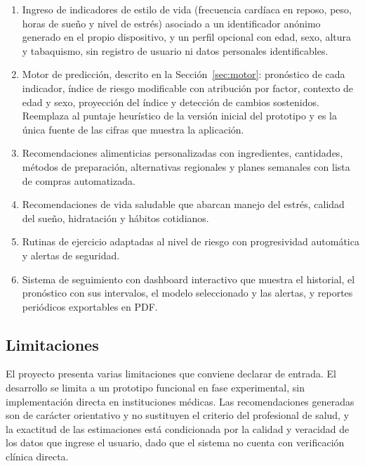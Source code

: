 \documentclass[12pt,letterpaper]{article}
\begin{document}
\begin{enumerate}
  \item Ingreso de indicadores de estilo de vida (frecuencia cardíaca en
    reposo, peso, horas de sueño y nivel de estrés) asociado a un identificador
    anónimo generado en el propio dispositivo, y un perfil opcional con edad,
    sexo, altura y tabaquismo, sin registro de usuario ni datos personales
    identificables.

  \item Motor de predicción, descrito en la Sección~\ref{sec:motor}: pronóstico
    de cada indicador, índice de riesgo modificable con atribución por factor,
    contexto de edad y sexo, proyección del índice y detección de cambios
    sostenidos. Reemplaza al puntaje heurístico de la versión inicial del
    prototipo y es la única fuente de las cifras que muestra la aplicación.

  \item Recomendaciones alimenticias personalizadas con ingredientes, cantidades,
    métodos de preparación, alternativas regionales y planes semanales con lista
    de compras automatizada.

  \item Recomendaciones de vida saludable que abarcan manejo del estrés, calidad
    del sueño, hidratación y hábitos cotidianos.

  \item Rutinas de ejercicio adaptadas al nivel de riesgo con progresividad
    automática y alertas de seguridad.

  \item Sistema de seguimiento con dashboard interactivo que muestra el
    historial, el pronóstico con sus intervalos, el modelo seleccionado y las
    alertas, y reportes periódicos exportables en PDF.
\end{enumerate}

\subsection{Limitaciones}

El proyecto presenta varias limitaciones que conviene declarar de entrada. El
desarrollo se limita a un prototipo funcional en fase experimental, sin
implementación directa en instituciones médicas. Las recomendaciones generadas
son de carácter orientativo y no sustituyen el criterio del profesional de
salud, y la exactitud de las estimaciones está condicionada por la calidad y
veracidad de los datos que ingrese el usuario, dado que el sistema no cuenta con
verificación clínica directa.
\end{document}
